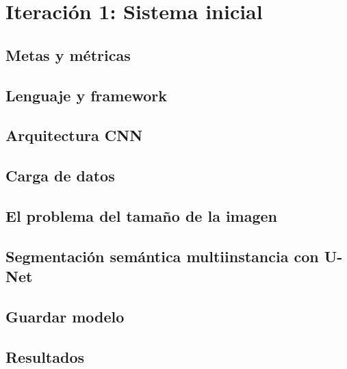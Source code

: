 \chapter{Iteración 1: Sistema inicial}\label{initial_system}

\section{Metas y m\'etricas}\label{sec:goals_and_metrics}

\section{Lenguaje y framework}\label{sec:language_and_framework}

\section{Arquitectura CNN}\label{sec:choose_cnn_arch}

\section{Carga de datos}\label{sec:intro_cloudcomputing}

\section{El problema del tamaño de la imagen}\label{sec:size_problem}

\section{Segmentación semántica multiinstancia con U-Net}\label{sec:multiinstance_segm}

\section{Guardar modelo}\label{sec:store_model}

\section{Resultados}\label{sec:initial_system_resultados}
